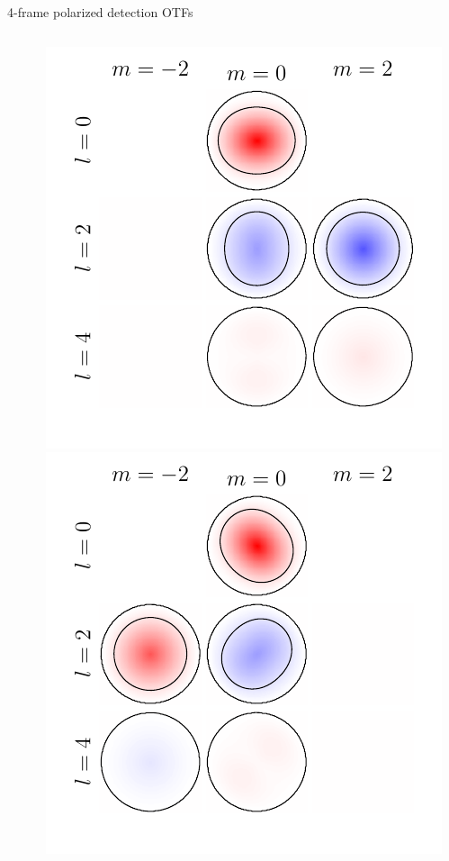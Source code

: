\documentclass[presentation]{beamer}
\begin{document}
\begin{frame}[label=sec-1]{4-frame polarized detection OTFs}
\begin{columns}
\begin{column}{0.25\textwidth}
    \end{column}
    \begin{column}{0.25\textwidth}
      \centering
      \includegraphics[width=1.0\columnwidth]{pol_detect/otf2.pdf}\\
      \includegraphics[width=1.0\columnwidth]{pol_detect/otf3.pdf}      
    \end{column}
  \end{columns}
\end{frame}
\end{document}
